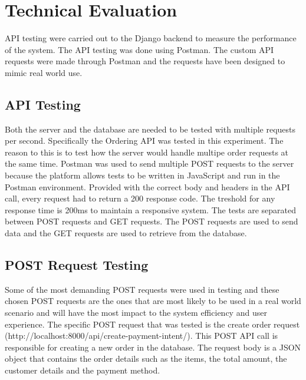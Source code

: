 \section{Technical Evaluation}
API testing were carried out to the Django backend to measure the performance of the system. The API testing was done using Postman. The custom API requests were made through Postman and the requests have been designed to mimic real world use.

\subsection{API Testing}
Both the server and the database are needed to be tested with multiple requests per second. Specifically the Ordering API was tested in this experiment. The reason to this is to test how the server would handle multipe order requests at the same time. Postman was used to send multiple POST requests to the server because the platform allows tests to be written in JavaScript and run in the Postman environment. Provided with the correct body and headers in the API call, every request had to return a 200 response code. The treshold for any response time is 200ms to maintain a responsive system. The tests are separated between POST requests and GET requests. The POST requests are used to send data and the GET requests are used to retrieve from the database.

\subsection{POST Request Testing}
Some of the most demanding POST requests were used in testing and these chosen POST requests are the ones that are most likely to be used in a real world scenario and will have the most impact to the system efficiency and user experience. The specific POST request that was tested is the create order request (http://localhost:8000/api/create-payment-intent/). This POST API call is responsible for creating a new order in the database. The request body is a JSON object that contains the order details such as the items, the total amount, the customer details and the payment method.



